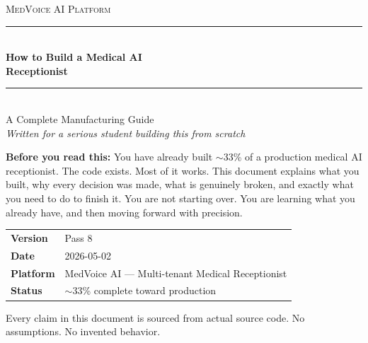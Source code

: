 \documentclass[12pt, a4paper]{report}
\begin{document}
\begin{titlepage}
  \thispagestyle{empty}
  \vspace*{2cm}

  {\color{mutedgray}\large\textsc{MedVoice AI Platform}}\\[0.3cm]
  {\color{accentblue}\rule{\linewidth}{1.5pt}}\\[0.5cm]

  {\Huge\bfseries How to Build a Medical AI\\[0.3cm]
  Receptionist}\\[0.5cm]

  {\color{accentblue}\rule{\linewidth}{0.6pt}}\\[0.5cm]

  {\large A Complete Manufacturing Guide\\
  \textit{Written for a serious student building this from scratch}}

  \vspace{1cm}

  \begin{quotebox}
    \textbf{Before you read this:} You have already built $\sim$33\% of a production
    medical AI receptionist. The code exists. Most of it works. This document explains
    what you built, why every decision was made, what is genuinely broken, and exactly
    what you need to do to finish it. You are not starting over. You are learning what
    you already have, and then moving forward with precision.
  \end{quotebox}

  \vfill

  \begin{tabular}{ll}
    \textbf{Version}  & Pass 8 \\
    \textbf{Date}     & 2026-05-02 \\
    \textbf{Platform} & MedVoice AI --- Multi-tenant Medical Receptionist \\
    \textbf{Status}   & $\sim$33\% complete toward production \\
  \end{tabular}

  \vspace{1cm}
  {\color{mutedgray}\footnotesize Every claim in this document is sourced from actual source code.
  No assumptions. No invented behavior.}
\end{titlepage}

\tableofcontents
\clearpage
\end{document}

